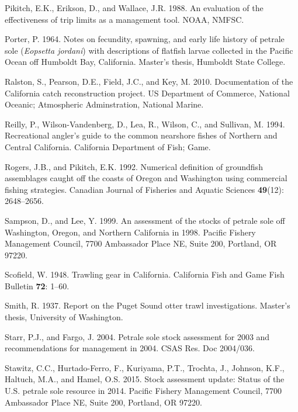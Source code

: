 \documentclass[12pt,]{article}
\begin{document}
\hypertarget{ref-pikitch_evaluation_1988}{}
Pikitch, E.K., Erikson, D., and Wallace, J.R. 1988. An evaluation of the
effectiveness of trip limits as a management tool. NOAA, NMFSC.

\hypertarget{ref-porter_notes_1964}{}
Porter, P. 1964. Notes on fecundity, spawning, and early life history of
petrale sole (\emph{Eopsetta jordani}) with descriptions of flatfish
larvae collected in the Pacific Ocean off Humboldt Bay, California.
Master's thesis, Humboldt State College.

\hypertarget{ref-ralston_documentation_2010}{}
Ralston, S., Pearson, D.E., Field, J.C., and Key, M. 2010. Documentation
of the California catch reconstruction project. US Department of
Commerce, National Oceanic; Atmospheric Adminstration, National Marine.

\hypertarget{ref-reilly_recreational_1994}{}
Reilly, P., Wilson-Vandenberg, D., Lea, R., Wilson, C., and Sullivan, M.
1994. Recreational angler's guide to the common nearshore fishes of
Northern and Central California. California Department of Fish; Game.

\hypertarget{ref-rogers_numerical_1992}{}
Rogers, J.B., and Pikitch, E.K. 1992. Numerical definition of groundfish
assemblages caught off the coasts of Oregon and Washington using
commercial fishing strategies. Canadian Journal of Fisheries and Aquatic
Sciences \textbf{49}(12): 2648--2656.

\hypertarget{ref-sampson_assessment_1999}{}
Sampson, D., and Lee, Y. 1999. An assessment of the stocks of petrale
sole off Washington, Oregon, and Northern California in 1998. Pacific
Fishery Management Council, 7700 Ambassador Place NE, Suite 200,
Portland, OR 97220.

\hypertarget{ref-scofield_trawling_1948}{}
Scofield, W. 1948. Trawling gear in California. California Fish and Game
Fish Bulletin \textbf{72}: 1--60.

\hypertarget{ref-smith_report_1937}{}
Smith, R. 1937. Report on the Puget Sound otter trawl investigations.
Master's thesis, University of Washington.

\hypertarget{ref-starr_petrale_2004}{}
Starr, P.J., and Fargo, J. 2004. Petrale sole stock assessment for 2003
and recommendations for management in 2004. CSAS Res. Doc 2004/036.

\hypertarget{ref-stawitz_stock_2015}{}
Stawitz, C.C., Hurtado-Ferro, F., Kuriyama, P.T., Trochta, J., Johnson,
K.F., Haltuch, M.A., and Hamel, O.S. 2015. Stock assessment update:
Status of the U.S. petrale sole resource in 2014. Pacific Fishery
Management Council, 7700 Ambassador Place NE, Suite 200, Portland, OR
97220.
\end{document}
